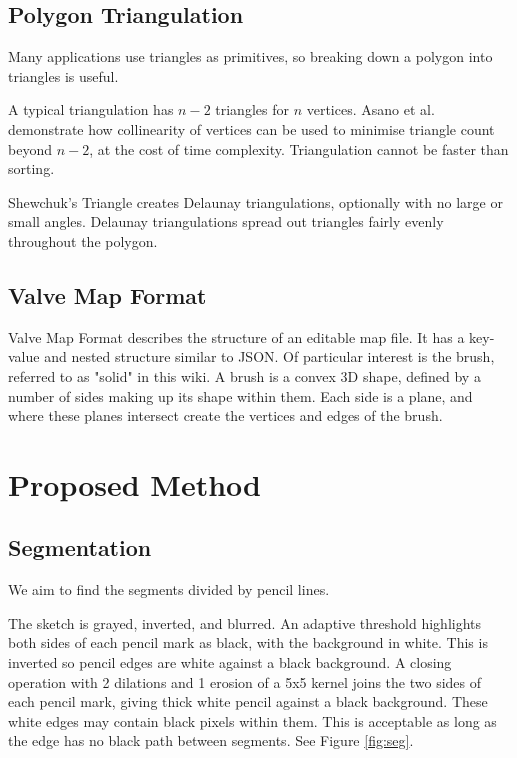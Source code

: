 \documentclass[11pt]{IEEEtran}
\begin{document}
\subsection{Polygon Triangulation}

Many applications use triangles as primitives, so breaking down a polygon into triangles is useful.

A typical triangulation has $n-2$ triangles for $n$ vertices. Asano et al. \cite{asano1986polygon} demonstrate how collinearity of vertices can be used to minimise triangle count beyond $n-2$, at the cost of time complexity. Triangulation cannot be faster than sorting. 

Shewchuk's Triangle \cite{shewchuk2005two} creates Delaunay triangulations, optionally with no large or small angles. Delaunay triangulations spread out triangles fairly evenly throughout the polygon.

\subsection{Valve Map Format}

Valve Map Format \cite{valve2006vmf} describes the structure of an editable map file. It has a key-value and nested structure similar to JSON. Of particular interest is the brush, referred to as "solid" in this wiki. A brush is a convex 3D shape, defined by a number of sides making up its shape within them. Each side is a plane, and where these planes intersect create the vertices and edges of the brush.

\section{Proposed Method}
\subsection{Segmentation}
We aim to find the segments divided by pencil lines.

The sketch is grayed, inverted, and blurred. An adaptive threshold highlights both sides of each pencil mark as black, with the background in white. This is inverted so pencil edges are white against a black background. A closing operation with 2 dilations and 1 erosion of a 5x5 kernel joins the two sides of each pencil mark, giving thick white pencil against a black background. These white edges may contain black pixels within them. This is acceptable as long as the edge has no black path between segments. See Figure \ref{fig:seg}.
\end{document}
